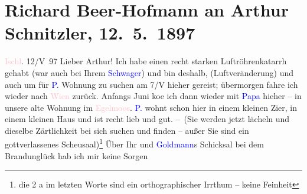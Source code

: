 

               \section[Richard Beer-Hofmann an Arthur Schnitzler, 12. 5. 1897]{ Richard Beer-Hofmann an Arthur Schnitzler,
               12. 5. 1897}\nopagebreak{}\rehead{ }\normalsize\beginnumbering{} \toendnotes[C]{\smallbreak\pagebreak[2]} 
\toendnotes[C]{\smallbreak}\pstart
           \centering{}{\pb}\textcolor{pink}{Ischl}{}\ledrightnote{\textcolor{pink}{Bad Ischl}}. 12/V 97\pend
           \pstart
           Lieber Arthur! Ich habe einen recht starken Luftröhrenkatarrh gehabt
               (war auch bei Ihrem \textcolor{blue}{Schwager}{}\ledrightnote{\textcolor{blue}{Markus Hajek}}) und bin deshalb,
               (Luftveränderung) und auch um für \textcolor{blue}{P.}{}\ledrightnote{\textcolor{blue}{Paula Beer-Hofmann}} Wohnung zu
               suchen am 7/V hieher gereist; übermorgen fahre ich wieder nach \textcolor{pink}{Wien}{}\ledrightnote{\textcolor{pink}{Wien}} zurück. Anfangs Juni ko{\geminationm}e {\pb}ich dann wieder mit \textcolor{blue}{Papa}{}
               hieher – in unsere alte Wohnung im \textcolor{pink}{Egelmoos}{}\ledrightnote{\textcolor{pink}{Eglmoosgasse}}. \textcolor{blue}{P.}{}\ledrightnote{\textcolor{blue}{Paula Beer-Hofmann}} wohnt schon hier in einem kleinen Zi{\geminationm}er, in einem kleinen Haus und ist recht lieb und gut.
               – (Sie werden jetzt lächeln und dieselbe Zärtlichkeit bei sich suchen und finden
               – außer Sie sind ein gottverlassenes {\pb}Scheusaal)\footnote{\noindent{}die 2 a im letzten Worte sind ein orthographischer Irrthum – keine Feinheit} Über Ihr und \textcolor{blue}{Goldmann}{}\ledrightnote{\textcolor{blue}{Paul Goldmann}}s Schicksal  bei dem Brandunglück hab ich mir keine Sorgen
